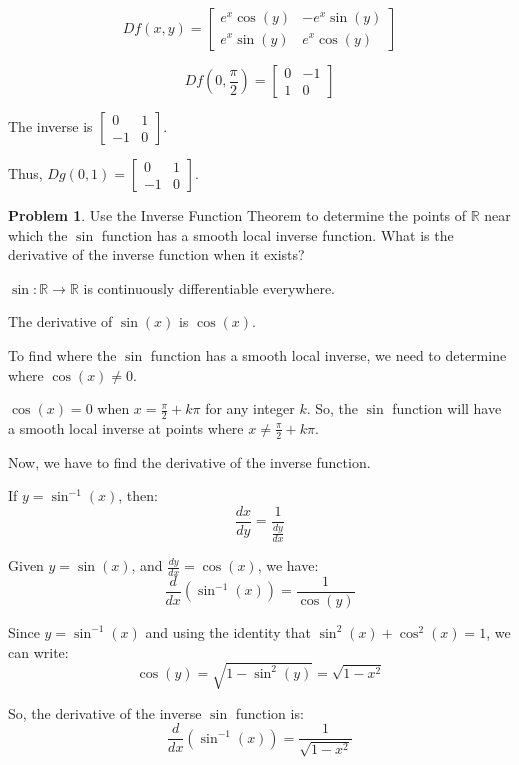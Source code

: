 \documentclass[12]{amsart}
\theoremstyle{definition}
\newtheorem{xca}{Problem}
\newcommand{\R}{\mathbb{R}}
\newcommand{\sskip}{\newpage}
\begin{document}
\[Df(x, y) = \begin{bmatrix}
    e^{x} \cos(y) & -e^{x} \sin(y) \\
    e^{x} \sin(y) & e^{x} \cos(y)
\end{bmatrix}\]

\[Df\left(0, \frac{\pi}{2}\right) = \begin{bmatrix}
    0 & -1 \\
    1 & 0
\end{bmatrix}\]

The inverse is $\begin{bmatrix}
    0 & 1 \\
    -1 & 0
\end{bmatrix}$.

Thus, $Dg(0, 1) = \begin{bmatrix}
    0 & 1 \\
    -1 & 0
\end{bmatrix}$.


\sskip
\begin{xca} %
Use the Inverse Function Theorem to determine the points of $\R$ near which the $\sin$ function has a smooth local inverse function.
What is the derivative of the inverse function when it exists?
\end{xca}


$\sin : \R \to \R$ is continuously differentiable everywhere.

The derivative of $\sin(x)$ is $\cos(x)$.

To find where the $\sin$ function has a smooth local inverse,
we need to determine where $\cos(x) \neq 0$.

$\cos(x) = 0$ when $x = \frac{\pi}{2} + k \pi$ for any integer $k$.
So, the $\sin$ function will have a smooth local inverse at points
where $x \neq \frac{\pi}{2} + k \pi$.

Now, we have to find the derivative of the inverse function.

If $y = \sin^{-1}(x)$, then:
\[\frac{dx}{dy} = \frac{1}{\frac{dy}{dx}}\]

Given $y = \sin(x)$, and $\frac{dy}{dx} = \cos(x)$, we have:
\[\frac{d}{dx}\left(\sin^{-1}(x)\right) = \frac{1}{\cos(y)}\]

Since $y = \sin^{-1}(x)$ and using the identity that $\sin^{2}(x) + \cos^{2}(x) = 1$,
we can write:
\[\cos(y) = \sqrt{1 - \sin^{2}(y)} = \sqrt{1 - x^2}\]

So, the derivative of the inverse $\sin$ function is:
\[\frac{d}{dx}\left(\sin^{-1}(x)\right) = \frac{1}{\sqrt{1 - x^2}}\]
\end{document}
